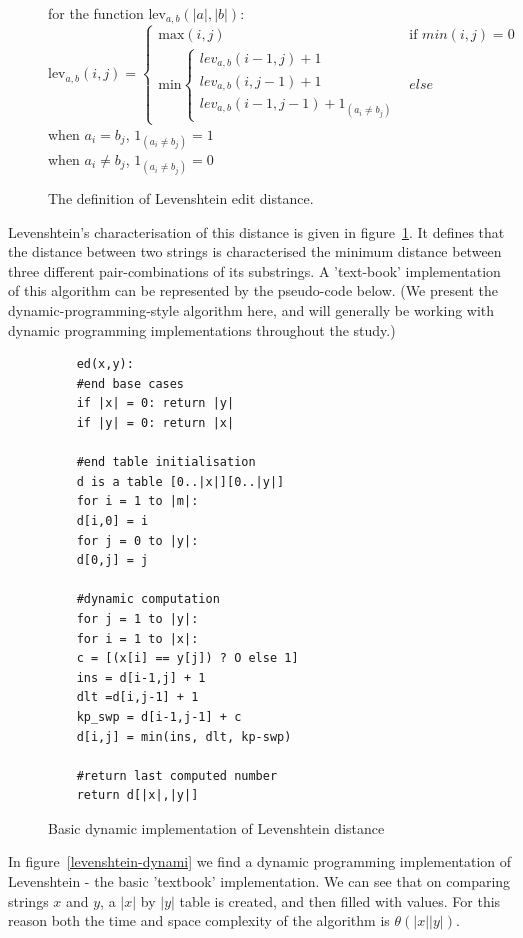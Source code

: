 \begin{figure}
  \label{fig:levdef}
  \centering
  for the function $\mbox{lev}_{a,b}(|a|,|b|)$:\\
  $$\mbox{lev}_{a,b}(i,j) = 
  \left\{
  \begin{array}{ll}
    \mbox{max}(i,j) & \mbox{if }min(i,j) = 0\\
    \mbox{min}\left\{
    \begin{array}{lll}
      lev_{a,b}(i-1,j)+1\\
      lev_{a,b}(i,j-1)+1\\
      lev_{a,b}(i-1,j-1)+1_{(a_i{\neq}b_j)}
    \end{array}
    \right.
    & else 
  \end{array}
  \right.$$
  when $a_i = b_j$, $1_{(a_i{\neq}b_j)} = 1$\\
  when  $a_i \neq b_j$, $1_{(a_i{\neq}b_j)} = 0$
  \caption{The definition of Levenshtein edit distance.}
\end{figure}

Levenshtein's characterisation of this distance is given in
figure~\ref{fig:levdef}. It defines that the distance between two
strings is characterised the minimum distance between three different
pair-combinations of its substrings. A 'text-book' implementation of
this algorithm can be represented by the pseudo-code below. (We
present the dynamic-programming-style algorithm here, and will
generally be working with dynamic programming implementations
throughout the study.)

\begin{figure}
  \centering
  \begin{lstlisting}
    ed(x,y):
    #end base cases
    if |x| = 0: return |y|
    if |y| = 0: return |x|    

    #end table initialisation
    d is a table [0..|x|][0..|y|]
    for i = 1 to |m|:
    d[i,0] = i
    for j = 0 to |y|:
    d[0,j] = j           
    
    #dynamic computation
    for j = 1 to |y|:
    for i = 1 to |x|:
    c = [(x[i] == y[j]) ? O else 1]
    ins = d[i-1,j] + 1
    dlt =d[i,j-1] + 1
    kp_swp = d[i-1,j-1] + c
    d[i,j] = min(ins, dlt, kp-swp)
    
    #return last computed number
    return d[|x|,|y|]
  \end{lstlisting}
  \caption{Basic dynamic implementation of Levenshtein distance}
  \label{fig:levenshtein-dynamic}
\end{figure}

In figure~\ref{levenshtein-dynami} we find a dynamic programming
implementation of Levenshtein - the basic 'textbook'
implementation. We can see that on comparing strings $x$ and $y$, a
$|x|$ by $|y|$ table is created, and then filled with values. For this
reason both the time and space complexity of the algorithm is $\theta
(|x||y|)$.

